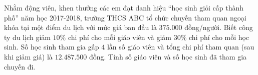 \begin{ex}%
	Nhằm động viên, khen thưởng các em đạt danh hiệu ``học sinh giỏi cấp thành phố'' năm học 2017-2018, trường THCS ABC tổ chức chuyến tham quan ngoại khóa tại một điểm du lịch với mức giá ban đầu là $375.000$ đồng/người. Biết công ty du lịch giảm $10\%$ chi phí cho mỗi giáo viên và giảm $30\%$ chi phí cho mỗi học sinh. Số học sinh tham gia gấp $4$ lần số giáo viên và tổng chi phí tham quan (sau khi giảm giá) là $12.487.500$ đồng. Tính số giáo viên và số học sinh đã tham gia chuyến đi.
\end{ex}
